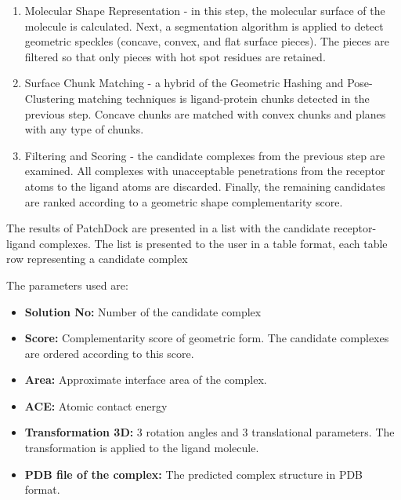 \documentclass[11pt, letterpaper, english]{article}
\begin{document}
\begin{enumerate}
    \item Molecular Shape Representation - in this step, the molecular surface of the molecule is calculated. Next, a segmentation algorithm is applied to detect geometric speckles (concave, convex, and flat surface pieces). The pieces are filtered so that only pieces with hot spot residues are retained.
    \item Surface Chunk Matching - a hybrid of the Geometric Hashing and Pose-Clustering matching techniques is ligand-protein chunks detected in the previous step. Concave chunks are matched with convex chunks and planes with any type of chunks.
    \item Filtering and Scoring - the candidate complexes from the previous step are examined. All complexes with unacceptable penetrations from the receptor atoms to the ligand atoms are discarded. Finally, the remaining candidates are ranked according to a geometric shape complementarity score.
\end{enumerate}

\par{The results of PatchDock are presented in a list with the candidate receptor-ligand complexes. The list is presented to the user in a table format, each table row representing a candidate complex}

\par{The parameters used are:}

\begin{itemize}
    \item\textbf{ Solution No:} Number of the candidate complex

    \item \textbf{Score:} Complementarity score of geometric form. The candidate complexes are ordered according to this score.

    \item \textbf{Area:} Approximate interface area of the complex.

    \item\textbf{ACE:} Atomic contact energy

    \item \textbf{Transformation 3D:} 3 rotation angles and 3 translational parameters. The transformation is applied to the ligand molecule.

    \item \textbf{PDB file of the complex:} The predicted complex structure in PDB format.
\end{itemize}
\end{document}
